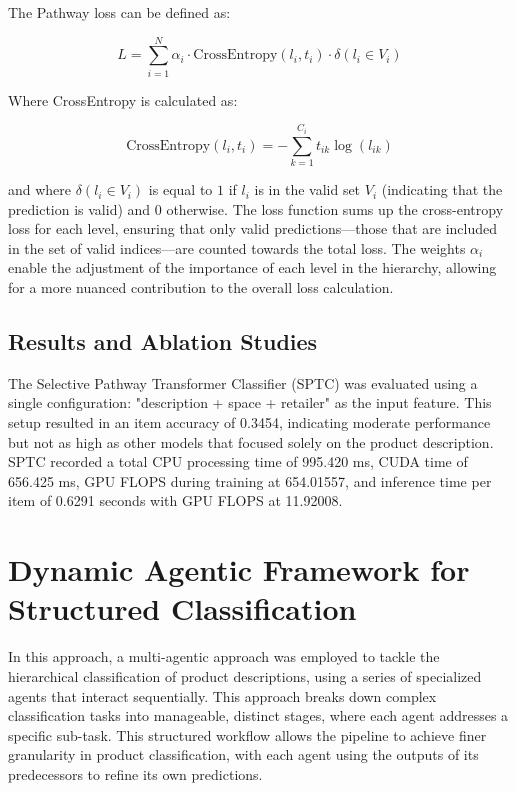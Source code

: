 \documentclass[9pt,a4paper,twoside]{rho-class/rho}
\begin{document}
        The Pathway loss can be defined as:
        
        \[
        L = \sum_{i=1}^{N} \alpha_i \cdot \text{CrossEntropy}(l_i, t_i) \cdot \delta(l_i \in V_i)
        \]
        
        Where CrossEntropy is calculated as:
          
        \[
        \text{CrossEntropy}(l_i, t_i) = -\sum_{k=1}^{C_i} t_{ik} \log(l_{ik})
        \]
        
        and where \(\delta(l_i \in V_i)\) is equal to \(1\) if \(l_i\) is in the valid set \(V_i\) (indicating that the prediction is valid) and \(0\) otherwise. The loss function sums up the cross-entropy loss for each level, ensuring that only valid predictions—those that are included in the set of valid indices—are counted towards the total loss. The weights \(\alpha_i\) enable the adjustment of the importance of each level in the hierarchy, allowing for a more nuanced contribution to the overall loss calculation.

     \subsection{Results and Ablation Studies}
    
        The Selective Pathway Transformer Classifier (SPTC) was evaluated using a single configuration: "description + space + retailer" as the input feature. This setup resulted in an item accuracy of 0.3454, indicating moderate performance but not as high as other models that focused solely on the product description. SPTC recorded a total CPU processing time of 995.420 ms, CUDA time of 656.425 ms, GPU FLOPS during training at 654.01557, and inference time per item of 0.6291 seconds with GPU FLOPS at 11.92008.


\section{Dynamic Agentic Framework for Structured Classification}

In this approach, a multi-agentic approach was employed to tackle the hierarchical classification of product descriptions, using a series of specialized agents that interact sequentially. This approach breaks down complex classification tasks into manageable, distinct stages, where each agent addresses a specific sub-task. This structured workflow allows the pipeline to achieve finer granularity in product classification, with each agent using the outputs of its predecessors to refine its own predictions.
\end{document}
